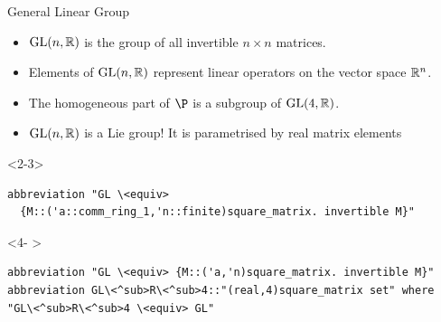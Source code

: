 \documentclass[12pt,notheorems,aspectratio=169,notes,handout]{beamer}
\begin{document}
\begin{frame}[fragile]{General Linear Group}
\newcommand{\GL}{\ensuremath{\text{GL}}}
\note[item]{}
\begin{overlayarea}{\textwidth}{0.5\textheight}
\begin{itemize}
  \item<1- > $\GL(n,\setR)$ is the group of all invertible $n\times n$ matrices.
  \item<3- > Elements of $\GL(n,\setR)$ represent linear operators on the vector space ${\mathord{\mathbb R}}^n$.
  \item<4- > The homogeneous part of $\P$ is a subgroup of $\GL(4,\setR)$.
  \item<5-6> $\GL(n,\setR)$ is a Lie group! It is parametrised by real matrix elements
\end{itemize}
\end{overlayarea}
\vfill
\begin{overlayarea}{\textwidth}{0.3\textheight}
\begin{onlyenv}<2-3>
\begin{lstlisting}
abbreviation "GL \<equiv>
  {M::('a::comm_ring_1,'n::finite)square_matrix. invertible M}"
\end{lstlisting}
\end{onlyenv}
\begin{onlyenv}<4- >
\begin{lstlisting}
abbreviation "GL \<equiv> {M::('a,'n)square_matrix. invertible M}"
abbreviation GL\<^sub>R\<^sub>4::"(real,4)square_matrix set" where "GL\<^sub>R\<^sub>4 \<equiv> GL"
\end{lstlisting}
\end{onlyenv}
\end{overlayarea}
\end{frame}
\end{document}
